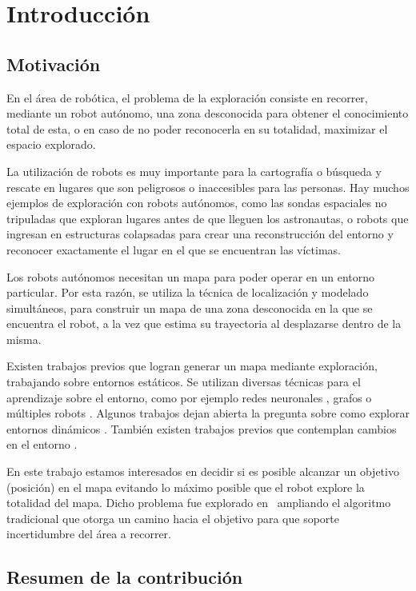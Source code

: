 \chapter{Introducción}

\section{Motivación}

En el área de robótica, el problema de la exploración consiste en recorrer, mediante un robot autónomo, una zona 
desconocida para obtener el conocimiento total de esta, o en caso de no poder reconocerla en su totalidad, maximizar 
el espacio explorado. 


La utilización de robots es muy importante para la cartografía o búsqueda y rescate en lugares que son peligrosos o 
inaccesibles para las personas. Hay muchos ejemplos de exploración con robots autónomos, como las sondas espaciales 
no tripuladas que exploran lugares antes de que lleguen los astronautas, o robots que ingresan en estructuras colapsadas 
para crear una reconstrucción del entorno y reconocer exactamente el lugar en el que se encuentran las víctimas.


Los robots autónomos necesitan un mapa para poder operar en un entorno particular. Por esta razón, se utiliza la técnica 
de localización y modelado simultáneos, para construir un mapa de una zona desconocida en la que se encuentra el robot, 
a la vez que estima su trayectoria al desplazarse dentro de la misma.


Existen trabajos previos que logran generar un mapa mediante exploración, trabajando sobre entornos estáticos. 
Se utilizan diversas técnicas para el aprendizaje sobre el entorno, como por ejemplo redes neuronales \cite{TP2}, 
grafos \cite{TP4} o múltiples robots \cite{TP5}. Algunos trabajos dejan abierta la pregunta sobre como explorar 
entornos dinámicos \cite{TP1} \cite{TP3}. También existen trabajos previos que contemplan cambios en el entorno \cite{TP6}.


En este trabajo estamos interesados en decidir si es posible alcanzar un 
objetivo (posición) en el mapa evitando lo máximo posible que el robot explore 
la totalidad del mapa. 
Dicho problema fue explorado 
en~\cite{melchior2007particle} ampliando el algoritmo tradicional que otorga 
un camino hacia el objetivo para que soporte incertidumbre del área a recorrer. 

\section{Resumen de la contribución}

